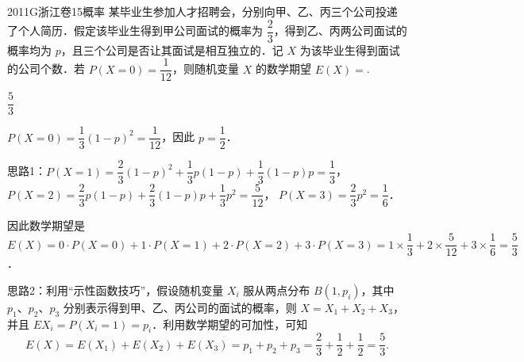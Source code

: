 
\begin{problem}{2011}{G}{浙江卷}{15}{概率}
某毕业生参加人才招聘会，分别向甲、乙、丙三个公司投递了个人简历．假定该毕业生得到甲公司面试的概率为 $\dfrac{2}{3}$，得到乙、丙两公司面试的概率均为 $p$，且三个公司是否让其面试是相互独立的．记 $X$ 为该毕业生得到面试的公司个数．若 $P(X=0)=\dfrac{1}{12}$，则随机变量 $X$ 的数学期望 $E(X)=$\underline{\hspace{4em}}.
\end{problem}

\begin{answer}
$\dfrac{5}{3}$
\end{answer}

\begin{solutions}
$P(X=0)=\dfrac{1}{3}(1-p)^2=\dfrac{1}{12}$，因此 $p=\dfrac{1}{2}$．

思路1：$P(X=1)=\dfrac{2}{3}(1-p)^2+\dfrac{1}{3}p(1-p)+\dfrac{1}{3}(1-p)p=\dfrac{1}{3}$，  
$P(X=2)=\dfrac{2}{3}p(1-p)+\dfrac{2}{3}(1-p)p+\dfrac{1}{3}p^2=\dfrac{5}{12}$，  
$P(X=3)=\dfrac{2}{3}p^2=\dfrac{1}{6}$．  

因此数学期望是 $E(X)=0\cdot P(X=0)+1\cdot P(X=1)+2\cdot P(X=2)+3\cdot P(X=3)=1\times\dfrac{1}{3}+2\times\dfrac{5}{12}+3\times\dfrac{1}{6}=\dfrac{5}{3}$．

思路2：利用“示性函数技巧”，假设随机变量 $X_i$ 服从两点分布 $B(1,p_i)$，其中 $p_1$、$p_2$、$p_3$ 分别表示得到甲、乙、丙公司的面试的概率，则 $X=X_1+X_2+X_3$，并且 $EX_i=P(X_i=1)=p_i$．利用数学期望的可加性，可知  
$$
E(X)=E(X_1)+E(X_2)+E(X_3)=p_1+p_2+p_3=\dfrac{2}{3}+\dfrac{1}{2}+\dfrac{1}{2}=\dfrac{5}{3}.
$$
\end{solutions}